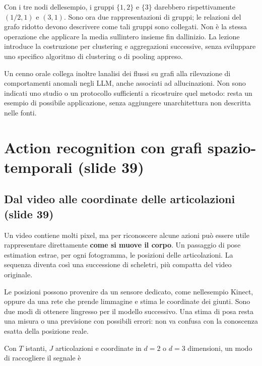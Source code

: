 \documentclass[11pt,a4paper,oneside,openany]{book}
\begin{document}
Con i tre nodi dell\textquotesingle esempio, i gruppi \(\{1,2\}\) e \(\{3\}\) darebbero rispettivamente \((1/2,1)\) e \((3,1)\). Sono ora due rappresentazioni di gruppi; le relazioni del grafo ridotto devono descrivere come tali gruppi sono collegati. Non è la stessa operazione che applicare la media sull\textquotesingle intero insieme fin dall\textquotesingle inizio. La lezione introduce la costruzione per clustering e aggregazioni successive, senza sviluppare uno specifico algoritmo di clustering o di pooling appreso.

Un cenno orale collega inoltre l\textquotesingle analisi dei flussi su grafi alla rilevazione di comportamenti anomali negli LLM, anche associati ad allucinazioni. Non sono indicati uno studio o un protocollo sufficienti a ricostruire quel metodo: resta un esempio di possibile applicazione, senza aggiungere un\textquotesingle architettura non descritta nelle fonti.

\section{Action recognition con grafi spazio-temporali (slide 39)}\label{f05-n30-r766}

\subsection{Dal video alle coordinate delle articolazioni (slide 39)}\label{f05-n30-r768}

Un video contiene molti pixel, ma per riconoscere alcune azioni può essere utile rappresentare direttamente \textbf{come si muove il corpo}. Un passaggio di pose estimation estrae, per ogni fotogramma, le posizioni delle articolazioni. La sequenza diventa così una successione di scheletri, più compatta del video originale.

Le posizioni possono provenire da un sensore dedicato, come nell\textquotesingle esempio Kinect, oppure da una rete che prende l\textquotesingle immagine e stima le coordinate dei giunti. Sono due modi di ottenere l\textquotesingle ingresso per il modello successivo. Una stima di posa resta una misura o una previsione con possibili errori: non va confusa con la conoscenza esatta della posizione reale.

Con \(T\) istanti, \(J\) articolazioni e coordinate in \(d=2\) o \(d=3\) dimensioni, un modo di raccogliere il segnale è
\end{document}
